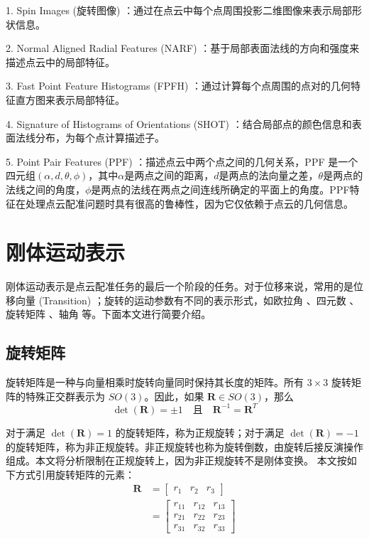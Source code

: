 1. Spin Images (旋转图像)  \cite{johnson1997spin} ：通过在点云中每个点周围投影二维图像来表示局部形状信息。

2. Normal Aligned Radial Features (NARF)  \cite{steder2010narf} ：基于局部表面法线的方向和强度来描述点云中的局部特征。

3. Fast Point Feature Histograms (FPFH)  \cite{rusu2009fast} ：通过计算每个点周围的点对的几何特征直方图来表示局部特征。

4. Signature of Histograms of Orientations (SHOT)  \cite{salti2014shot} ：结合局部点的颜色信息和表面法线分布，为每个点计算描述子。

5. Point Pair Features (PPF)  \cite{deng2018ppfnet} ：描述点云中两个点之间的几何关系，PPF 是一个四元组$(\alpha, d, \theta, \phi)$，其中$\alpha$是两点之间的距离，$d$是两点的法向量之差，$\theta$是两点的法线之间的角度，$\phi$是两点的法线在两点之间连线所确定的平面上的角度。PPF特征在处理点云配准问题时具有很高的鲁棒性，因为它仅依赖于点云的几何信息。

\section{刚体运动表示}
刚体运动表示是点云配准任务的最后一个阶段的任务。对于位移来说，常用的是位移向量 (Transition) ；旋转的运动参数有不同的表示形式，如欧拉角\cite{pio1966euler} 、四元数\cite{shoemake1985animating} 、旋转矩阵\cite{horn1954doubly} 、轴角\cite{diebel2006representing} 等。下面本文进行简要介绍。

\subsection{旋转矩阵}
旋转矩阵是一种与向量相乘时旋转向量同时保持其长度的矩阵。所有 $3 \times 3$ 旋转矩阵的特殊正交群表示为 $SO(3)$。因此，如果 $\boldsymbol{R} \in SO(3)$，那么
\begin{equation}
\det (\boldsymbol{R}) = \pm1 \quad \text{且} \quad \boldsymbol{R}^{-1} = \boldsymbol{R}^T
\end{equation}

对于满足 $\det (\boldsymbol{R}) = 1$ 的旋转矩阵，称为正规旋转；对于满足 $\det (\boldsymbol{R}) = -1$ 的旋转矩阵，称为非正规旋转。非正规旋转也称为旋转倒数，由旋转后接反演操作组成。本文将分析限制在正规旋转上，因为非正规旋转不是刚体变换。
本文按如下方式引用旋转矩阵的元素：
\begin{align}
    \boldsymbol{R} &=
    \begin{bmatrix}
    r_1 & r_2 & r_3
    \end{bmatrix} \\
    &=
    \begin{bmatrix}
    r_{11} & r_{12} & r_{13} \\
    r_{21} & r_{22} & r_{23} \\
    r_{31} & r_{32} & r_{33}
    \end{bmatrix}
\end{align}

